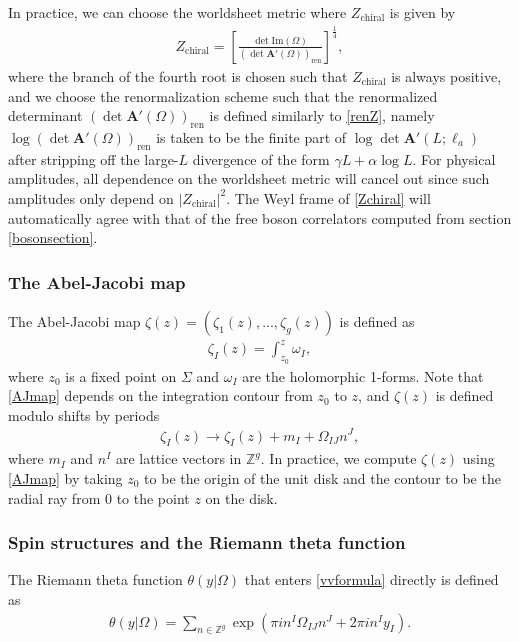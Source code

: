 \documentclass[12pt]{article}
\def\ie{\begin{equation}\begin{aligned}}
\def\fe{\end{aligned}\end{equation}}
\numberwithin{equation}{section}
\begin{document}
In practice, we can choose the worldsheet metric where $Z_\text{chiral}$ is given by
\ie \label{Zchiral}
Z_\text{chiral} = \left[\frac{\det \mathrm{Im}(\Omega)}{\left(\det \mathbf{A}'(\Omega)\right)_\text{ren}}\right]^{\frac{1}{4}},
\fe
where the branch of the fourth root is chosen such that $Z_\text{chiral}$ is always positive, and we choose the renormalization scheme such that the renormalized determinant $\left(\det \mathbf{A}'(\Omega)\right)_\text{ren}$ is defined similarly to \eqref{renZ}, namely $\log\left(\det \mathbf{A}'(\Omega)\right)_\text{ren}$ is taken to be the finite part of $\log \det \mathbf{A}'(L;\ell_a)$ after stripping off the large-$L$ divergence of the form $\gamma L+\alpha\log L$. For physical amplitudes, all dependence on the worldsheet metric will cancel out since such amplitudes only depend on $|Z_\text{chiral}|^2$. The Weyl frame of \eqref{Zchiral} will automatically agree with that of the free boson correlators computed from section \ref{bosonsection}.

\subsubsection*{The Abel-Jacobi map}

The Abel-Jacobi map $\zeta(z)=(\zeta_1(z),...,\zeta_g(z))$ is defined as
\ie \label{AJmap}
\zeta_I(z) = \int_{z_0}^z \omega_I,
\fe
where $z_0$ is a fixed point on $\Sigma$ and $\omega_I$ are the holomorphic 1-forms. Note that \eqref{AJmap} depends on the integration contour from $z_0$ to $z$, and $\zeta(z)$ is defined modulo shifts by periods
\ie \label{AJshift}
\zeta_I(z) \rightarrow \zeta_I(z)+ m_I + \Omega_{IJ}n^J,
\fe
where $m_I$ and $n^I$ are lattice vectors in $\mathbb{Z}^g$. In practice, we compute $\zeta(z)$ using \eqref{AJmap} by taking $z_0$ to be the origin of the unit disk and the contour to be the radial ray from $0$ to the point $z$ on the disk.

\subsubsection*{Spin structures and the Riemann theta function}

The Riemann theta function $\theta(y|\Omega)$ that enters \eqref{vvformula} directly is defined as
\ie
\theta(y|\Omega)=\sum_{n \in \mathbb{Z}^g} \exp \left(\pi in^I \Omega_{I J}n^J+2 \pi in^I y_I\right).
\fe
\end{document}
